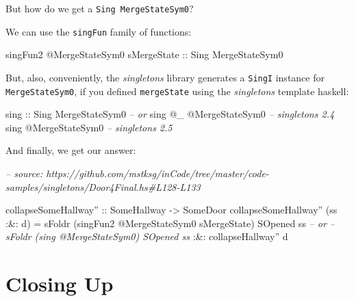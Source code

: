 \documentclass[]{article}
\newenvironment{Shaded}{}{}
\newcommand{\CommentTok}[1]{\textcolor[rgb]{0.38,0.63,0.69}{\textit{#1}}}
\newcommand{\DataTypeTok}[1]{\textcolor[rgb]{0.56,0.13,0.00}{#1}}
\newcommand{\FunctionTok}[1]{\textcolor[rgb]{0.02,0.16,0.49}{#1}}
\newcommand{\NormalTok}[1]{#1}
\newcommand{\OtherTok}[1]{\textcolor[rgb]{0.00,0.44,0.13}{#1}}
\begin{document}
But how do we get a \texttt{Sing\ MergeStateSym0}?

We can use the \texttt{singFun} family of functions:

\begin{Shaded}
\begin{Highlighting}[]
\NormalTok{singFun2 }\FunctionTok{@}\DataTypeTok{MergeStateSym0}\NormalTok{ sMergeState}
\OtherTok{    ::} \DataTypeTok{Sing} \DataTypeTok{MergeStateSym0}
\end{Highlighting}
\end{Shaded}

But, also, conveniently, the \emph{singletons} library generates a
\texttt{SingI} instance for \texttt{MergeStateSym0}, if you defined
\texttt{mergeState} using the \emph{singletons} template haskell:

\begin{Shaded}
\begin{Highlighting}[]
\OtherTok{sing ::} \DataTypeTok{Sing} \DataTypeTok{MergeStateSym0}
\CommentTok{-- or}
\NormalTok{sing }\FunctionTok{@}\NormalTok{_ }\FunctionTok{@}\DataTypeTok{MergeStateSym0}         \CommentTok{-- singletons 2.4}
\NormalTok{sing }\FunctionTok{@}\DataTypeTok{MergeStateSym0}            \CommentTok{-- singletons 2.5}
\end{Highlighting}
\end{Shaded}

And finally, we get our answer:

\begin{Shaded}
\begin{Highlighting}[]
\CommentTok{-- source: https://github.com/mstksg/inCode/tree/master/code-samples/singletons/Door4Final.hs#L128-L133}

\OtherTok{collapseSomeHallway'' ::} \DataTypeTok{SomeHallway} \OtherTok{->} \DataTypeTok{SomeDoor}
\NormalTok{collapseSomeHallway'' (ss }\FunctionTok{:&:}\NormalTok{ d) }\FunctionTok{=}
\NormalTok{        sFoldr (singFun2 }\FunctionTok{@}\DataTypeTok{MergeStateSym0}\NormalTok{ sMergeState) }\DataTypeTok{SOpened}\NormalTok{ ss}
     \CommentTok{-- or}
     \CommentTok{-- sFoldr (sing @MergeStateSym0) SOpened ss}
    \FunctionTok{:&:}\NormalTok{ collapseHallway'' d}
\end{Highlighting}
\end{Shaded}

\hypertarget{closing-up}{%
\section{Closing Up}\label{closing-up}}
\end{document}
